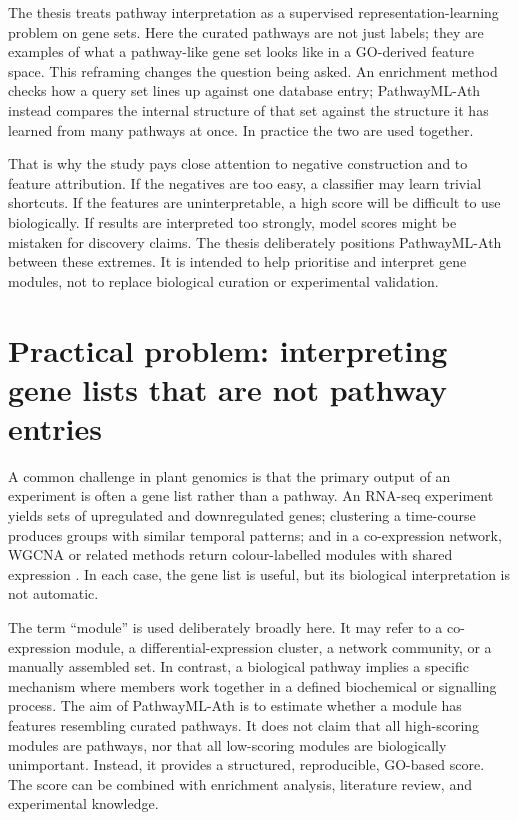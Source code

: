 \documentclass[12pt,letterpaper,oneside,openany]{book}
\begin{document}
The thesis treats pathway interpretation as a supervised representation-learning problem on gene sets. Here the curated pathways are not just labels; they are examples of what a pathway-like gene set looks like in a GO-derived feature space. This reframing changes the question being asked. An enrichment method checks how a query set lines up against one database entry; PathwayML-Ath instead compares the internal structure of that set against the structure it has learned from many pathways at once. In practice the two are used together.

That is why the study pays close attention to negative construction and to feature attribution. If the negatives are too easy, a classifier may learn trivial shortcuts. If the features are uninterpretable, a high score will be difficult to use biologically. If results are interpreted too strongly, model scores might be mistaken for discovery claims. The thesis deliberately positions PathwayML-Ath between these extremes. It is intended to help prioritise and interpret gene modules, not to replace biological curation or experimental validation.

\section{Practical problem: interpreting gene lists that are not pathway entries}
\label{sec:bg_practical_problem}

A common challenge in plant genomics is that the primary output of an experiment is often a gene list rather than a pathway. An RNA-seq experiment yields sets of upregulated and downregulated genes; clustering a time-course produces groups with similar temporal patterns; and in a co-expression network, WGCNA or related methods return colour-labelled modules with shared expression \citep{langfelder2008wgcna,obayashi2018atted,liesecke2018ranking}. In each case, the gene list is useful, but its biological interpretation is not automatic.

The term ``module'' is used deliberately broadly here. It may refer to a co-expression module, a differential-expression cluster, a network community, or a manually assembled set. In contrast, a biological pathway implies a specific mechanism where members work together in a defined biochemical or signalling process. The aim of PathwayML-Ath is to estimate whether a module has features resembling curated pathways. It does not claim that all high-scoring modules are pathways, nor that all low-scoring modules are biologically unimportant. Instead, it provides a structured, reproducible, GO-based score. The score can be combined with enrichment analysis, literature review, and experimental knowledge.
\end{document}
